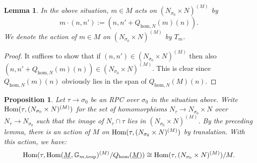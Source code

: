 \documentclass[11pt]{amsart}
\newtheorem{proposition}[theorem]{Proposition}
\newtheorem{lemma}[theorem]{Lemma}
\theoremstyle{definition}
\theoremstyle{remark}
\def\hom{\mathrm{hom}}
\def\trop{\mathrm{trop}}
\DeclareMathOperator{\Hom}{\textup{Hom}}
\begin{document}
\begin{lemma}
	In the above situation, $m\in M$ acts on $(N_{\sigma_0}\times N)^{(M)}$ by
	$$m\cdot (n,n'):=(n,n'+Q_{\hom,N}(m)(n)).$$
	We denote the action of $m\in M$ on $(N_{\sigma_0}\times N)^{(M)}$ by $T_m$.
\end{lemma}

\begin{proof}
	It suffices to show that if $(n,n')\in (N_{\sigma_0}\times N)^{(M)}$ then also $(n,n'+Q_{\hom,N}(m)(n))\in (N_{\sigma_0}\times N)^{(M)}$.
	This is clear since $Q_{\hom,N}(m)(n)$ obviously lies in the span of $Q_{\hom,N}(M)(n)$.
\end{proof}

\begin{proposition}
	\label{prop:alternative_descr_trop_torus}
	Let $\tau\to \sigma_0$ be an RPC over $\sigma_0$ in the situation above. Write $\Hom(\tau,(N_{\sigma_0}\times N)^{(M)})$
	for the set of homomorphisms $N_{\tau}\to N_{\sigma_0}\times N$ over $N_{\tau}\to N_{\sigma_0}$ such that the image
	of $N_{\tau}\cap \tau$ lies in $(N_{\sigma_0}\times N)^{(M)}$. By the preceding lemma, there is an action of $M$
	on $\Hom(\tau,(N_{\sigma_0}\times N)^{(M)})$ by translation. With this action, we have:
	$$\Hom(\tau,\Hom(\underline{M},\mathbb{G}_{m,\trop})^{(M)}/Q_{\hom}(\underline{M}))\cong \Hom(\tau,(N_{\sigma_0}\times N)^{(M)})/M.$$
\end{proposition}
\end{document}
